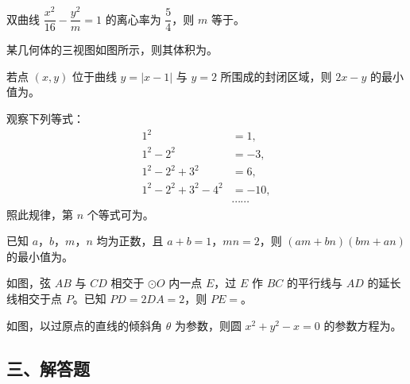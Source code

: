 \begin{question}
双曲线 $\dfrac{x^2}{16}-\dfrac{y^2}{m}=1$ 的离心率为 $\dfrac54$，则 $m$ 等于\gkblank{}。

\Needspace{0.4\textheight}
\end{question}
\begin{question}
某几何体的三视图如图所示，则其体积为\gkblank{}。
\nopagebreak[4]
\begin{center}\end{center}
\nopagebreak[4]
\end{question}
\begin{question}
若点 $(x,y)$ 位于曲线 $y=|x-1|$ 与 $y=2$ 所围成的封闭区域，则 $2x-y$ 的最小值为\gkblank{}。

\end{question}
\begin{question}
观察下列等式：
\nopagebreak[4]
\[\begin{aligned}
1^2&=1,\\
1^2-2^2&=-3,\\
1^2-2^2+3^2&=6,\\
1^2-2^2+3^2-4^2&=-10,\\
&\cdots\cdots
\end{aligned}\]
照此规律，第 $n$ 个等式可为\gkblank{}。

\end{question}
\begin{question}
已知 $a$，$b$，$m$，$n$ 均为正数，且 $a+b=1$，$mn=2$，则 $(am+bn)(bm+an)$ 的最小值为\gkblank{}。

\Needspace{0.4\textheight}
\end{question}
\begin{question}
如图，弦 $AB$ 与 $CD$ 相交于 $\odot O$ 内一点 $E$，过 $E$ 作 $BC$ 的平行线与 $AD$ 的延长线相交于点 $P$。已知 $PD=2DA=2$，则 $PE=$\gkblank{}。
\nopagebreak[4]
\begin{center}\end{center}
\nopagebreak[4]
\Needspace{0.4\textheight}
\end{question}
\begin{question}
如图，以过原点的直线的倾斜角 $\theta$ 为参数，则圆 $x^2+y^2-x=0$ 的参数方程为\gkblank{}。
\nopagebreak[4]
\begin{center}\end{center}
\nopagebreak[4]
\end{question}
\begingroup
\renewcommand{\gkpart}[1]{\Needspace{0.2\textheight}\subsection*{#1}\nopagebreak}
\gkpart{三、解答题}
\endgroup

